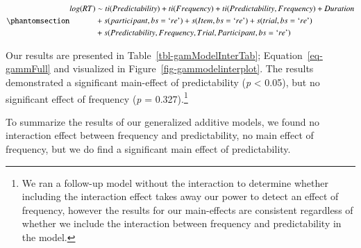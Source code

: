 \documentclass[
  authoryear,
  preprint,
  1p,
  onecolumn]{elsarticle}
\begin{document}
\begin{equation}\phantomsection\label{eq-gammFull}{
\begin{aligned}log(RT) & \sim ti(Predictability) + ti(Frequency) + ti(Predictability, Frequency) + Duration \\ & + s(participant, bs = \text{`}re\text{'}) + s(Item, bs = \text{`}re\text{'})  + s(trial, bs = \text{`}re\text{'}) \\ & + s(Predictability, Frequency, Trial, Participant, bs = \text{`}re\text{'}) \end{aligned}
}\end{equation}

Our results are presented in Table~\ref{tbl-gamModelInterTab};
Equation~\ref{eq-gammFull} and visualized in
Figure~\ref{fig-gammodelinterplot}. The results demonstrated a
significant main-effect of predictability (\emph{p} \textless{} 0.05),
but no significant effect of frequency (\emph{p} = 0.327).\footnote{We
  ran a follow-up model without the interaction to determine whether
  including the interaction effect takes away our power to detect an
  effect of frequency, however the results for our main-effects are
  consistent regardless of whether we include the interaction between
  frequency and predictability in the model.}

To summarize the results of our generalized additive models, we found no
interaction effect between frequency and predictability, no main effect
of frequency, but we do find a significant main effect of
predictability.

\begin{table}

\caption{\label{tbl-gamModelTab}Model results for the generalized
Additive Mixed Model cotanining only the interaction between frequency
and predictability.}


\end{table}%
\end{document}
